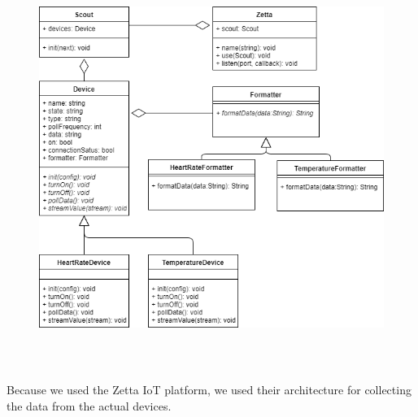 \begin{center}
\begin{figure}[h]
	\includegraphics[width=15cm, height=13cm]{DataCollection/DataCollectionDiagram.png}
\end{figure}
\end{center}
Because we used the Zetta IoT platform, we used their architecture for collecting the data from the actual devices. 
